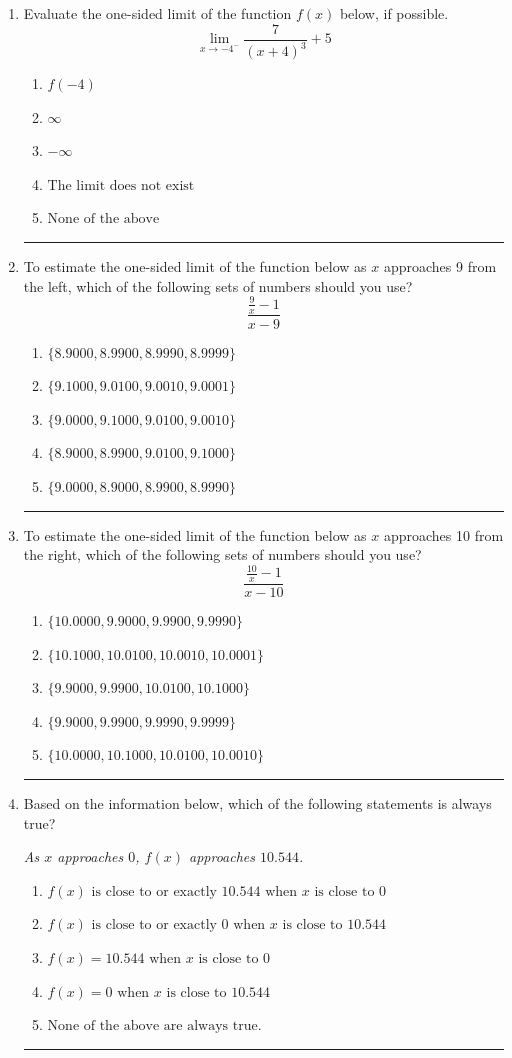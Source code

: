 \documentclass[14pt]{extbook}
\newcommand{\litem}[1]{\item#1\hspace*{-1cm}\rule{\textwidth}{0.4pt}}
\begin{document}
\begin{enumerate}
{\begin{enumerate}[label=\Alph*.]
\end{enumerate} }
\litem{
Evaluate the one-sided limit of the function $f(x)$ below, if possible.\[ \lim_{x \rightarrow -4^-} \frac{7}{(x+4)^3}+5 \]\begin{enumerate}[label=\Alph*.]
\item \( f(-4) \)
\item \( \infty \)
\item \( -\infty \)
\item \( \text{The limit does not exist} \)
\item \( \text{None of the above} \)

\end{enumerate} }
\litem{
To estimate the one-sided limit of the function below as $x$ approaches 9 from the left, which of the following sets of numbers should you use?\[ \frac{\frac{9}{x} - 1}{x - 9} \]\begin{enumerate}[label=\Alph*.]
\item \( \{ 8.9000, 8.9900, 8.9990, 8.9999 \} \)
\item \( \{ 9.1000, 9.0100, 9.0010, 9.0001 \} \)
\item \( \{ 9.0000, 9.1000, 9.0100, 9.0010 \} \)
\item \( \{ 8.9000, 8.9900, 9.0100, 9.1000 \} \)
\item \( \{ 9.0000, 8.9000, 8.9900, 8.9990 \} \)

\end{enumerate} }
\litem{
To estimate the one-sided limit of the function below as $x$ approaches 10 from the right, which of the following sets of numbers should you use?\[ \frac{\frac{10}{x} - 1}{x - 10} \]\begin{enumerate}[label=\Alph*.]
\item \( \{ 10.0000, 9.9000, 9.9900, 9.9990 \} \)
\item \( \{ 10.1000, 10.0100, 10.0010, 10.0001 \} \)
\item \( \{ 9.9000, 9.9900, 10.0100, 10.1000 \} \)
\item \( \{ 9.9000, 9.9900, 9.9990, 9.9999 \} \)
\item \( \{ 10.0000, 10.1000, 10.0100, 10.0010 \} \)

\end{enumerate} }
\litem{
Based on the information below, which of the following statements is always true?
\begin{center}
    \textit{ As $x$ approaches $0$, $f(x)$ approaches $10.544$. }
\end{center}
\begin{enumerate}[label=\Alph*.]
\item \( f(x) \text{ is close to or exactly } 10.544 \text{ when } x \text{ is close to } 0 \)
\item \( f(x) \text{ is close to or exactly } 0 \text{ when } x \text{ is close to } 10.544 \)
\item \( f(x) = 10.544 \text{ when } x \text{ is close to } 0 \)
\item \( f(x) = 0 \text{ when } x \text{ is close to } 10.544 \)
\item \( \text{None of the above are always true.} \)


\end{enumerate}}
\end{enumerate}
\end{document}

